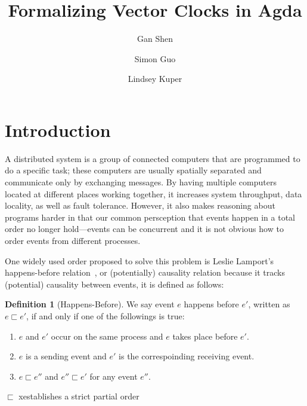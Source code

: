 \documentclass[acmsmall,review,anonymous]{acmart}
\title{Formalizing Vector Clocks in Agda}
\author{Gan Shen}
\affiliation{\institution{University of California, Santa Cruz} \country{USA}}
\author{Simon Guo}
\affiliation{\institution{University of California, Santa Cruz} \country{USA}}
\author{Lindsey Kuper}
\affiliation{\institution{University of California, Santa Cruz} \country{USA}}
\theoremstyle{definition}
\newtheorem{definition}{Definition}
\theoremstyle{theorem}
\begin{document}
\maketitle

\section{Introduction}
A distributed system is a group of connected computers that are
programmed to do a specific task; these computers are usually
spatially separated and communicate only by exchanging messages. By
having multiple computers located at different places working
together, it increases system throughput, data locality, as well as
fault tolerance. However, it also makes reasoning about programs
harder in that our common persception that events happen in a total
order no longer hold---events can be concurrent and it is not obvious
how to order events from different processes.

One widely used order proposed to solve this problem is Leslie
Lamport's happens-before relation~\cite{lamport1978}, or (potentially)
causality relation because it tracks (potential) causality between
events, it is defined as follows:
\begin{definition}[Happens-Before]
  We say event $e$ happens before $e'$, written as $e \sqsubset e'$,
  if and only if one of the followings is true:
  \begin{enumerate}
  \item $e$ and $e'$ occur on the same process and $e$ takes place before $e'$.
  \item $e$ is a sending event and $e'$ is the correspoinding receiving event.
  \item $e \sqsubset e''$ and $e'' \sqsubset e'$ for any event $e''$.
  \end{enumerate}
\end{definition}
$\sqsubset$ xestablishes a strict partial order
\end{document}
